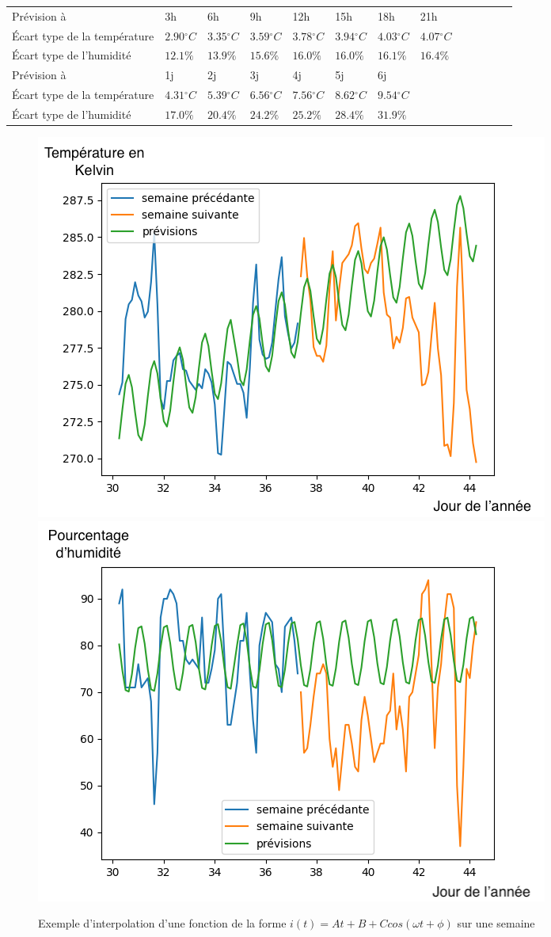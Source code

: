 \documentclass[11pt,a4paper]{article}
\begin{document}
\begin{tabular}{lllllllllllll}\hline
\hline
Prévision à                  &3h                         &6h                        &9h                           &12h                         &15h                          &18h          &         21h      \\
Écart type de la température& $2.90{}^{\circ}C$& $3.35{}^{\circ}C$& $3.59{}^{\circ}C$& $3.78{}^{\circ}C$& $3.94{}^{\circ}C$& $4.03{}^{\circ}C$&$4.07{}^{\circ}C$\\
Écart type de l'humidité &$12.1\%$ & $13.9\%$ & $15.6\%$ & $16.0\%$ & $16.0\%$ & $16.1\%$ & $16.4\%$  \\
\hline
Prévision à                  & 1j &           2j            &3j            &4j          &5j            & 6j & \\
Écart type de la température&$4.31{}^{\circ}C$&$5.39{}^{\circ}C$&$6.56{}^{\circ}C$&$7.56{}^{\circ}C$&$8.62{}^{\circ}C$&$9.54{}^{\circ}C$ \\
Écart type de l'humidité      & $17.0\%$ &  $ 20.4\% $         &  $ 24.2\% $         &  $ 25.2\% $        &  $ 28.4\% $         &  $ 31.9\% $  \\
\hline 
\end{tabular}
	
\begin{figure} [H]
\centering
\includegraphics[width=0.48 \textwidth]{./imagesTIPE/cosDS.png}\quad
\includegraphics[width=0.48 \textwidth]{./imagesTIPE/cosDSH.png}
\caption{\label{fig:cosDS} Exemple d'interpolation d'une fonction de la forme $i(t) = At +B + C cos (\omega t + \phi)$ sur une semaine}
\end{figure}
\end{document}
